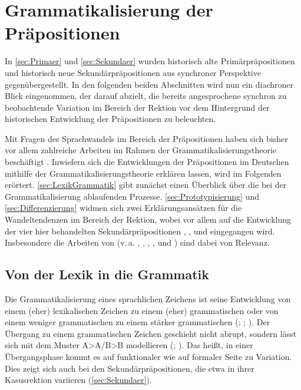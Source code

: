 \section{Grammatikalisierung der Präpositionen}\label{sec:Grammatikalisierung}
In \autoref{sec:Primaer} und \autoref{sec:Sekundaer} wurden historisch alte Primärpräpositionen und historisch neue Sekundärpräpositionen aus synchroner Perspektive gegenübergestellt. 
In den folgenden beiden Abschnitten wird nun ein diachroner Blick eingenommen, der darauf abzielt, die bereits angesprochene synchron zu beobachtende Variation im Bereich der Rektion vor dem Hintergrund der historischen Entwicklung der Präpositionen zu beleuchten.

Mit Fragen des Sprachwandels im Bereich der Präpositionen haben sich bisher vor allem zahlreiche Arbeiten im Rahmen der Grammatikalisierungstheorie beschäftigt \citep[etwa][]{Lehmann1992, Lindqvist1994,  DiMeola2000, Szczepaniak2011}. 
Inwiefern sich die Entwicklungen der Präpositionen im Deutschen mithilfe der Grammatikalisierungstheorie erklären lassen, wird im Folgenden erörtert. \autoref{sec:LexikGrammatik} gibt zunächst einen Überblick über die bei der Grammatikalisierung ablaufenden Prozesse. 
\autoref{sec:Prototypisierung} und \autoref{sec:Differenzierung} widmen sich zwei Erklärungsansätzen für die Wandeltendenzen im Bereich der Rektion, wobei vor allem auf die Entwicklung der vier hier behandelten Sekundärpräpositionen , ,  und  eingegangen wird. 
Insbesondere die Arbeiten von \citeauthor{DiMeola2000} (v.\,a. \citeyear{DiMeola1998}, \citeyear{DiMeola2001}, \citeyear{DiMeola2001}, \citeyear{DiMeola2003},  \citeyear{DiMeola2004} und \citeyear{DiMeola2011}) sind dabei von Relevanz.  
\subsection{Von der Lexik in die Grammatik}
\label{sec:LexikGrammatik}
Die Grammatikalisierung eines sprachlichen Zeichens ist seine Entwicklung von einem (eher) lexikalischen Zeichen zu einem (eher) grammatischen oder von einem weniger grammatischen zu einem stärker grammatischen (\citealp[s.][303]{Lehmann.1985}; \citeyear[193]{Lehmann.1991}; \citealp[2]{Heine.1991}). 
Der Übergang zu einem grammatischen Zeichen geschieht nicht abrupt, sondern lässt sich mit dem Muster A>A/B>B modellieren (\citealp[s.][107]{Heine.1991}; \citealp[15]{Lehmann.1995}). 
Das heißt, in einer Übergangsphase kommt es auf funktionaler wie auf formaler Seite zu Variation. 
Dies zeigt sich auch bei den Sekundärpräpositionen, die etwa in ihrer Kasusrektion variieren (\autoref{sec:Sekundaer}). 

